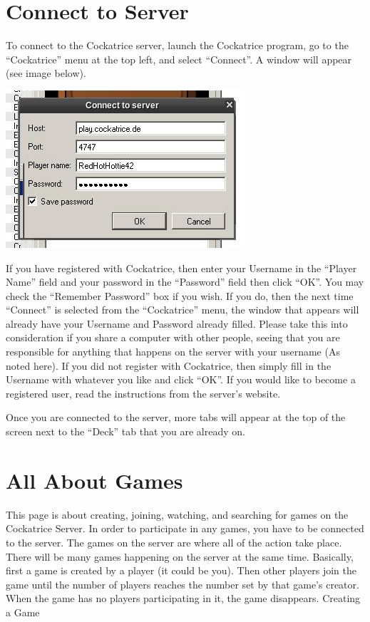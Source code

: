 \documentclass[a4paper]{scrbook}
\begin{document}
\section{Connect to Server}
To connect to the Cockatrice server, launch the Cockatrice program, go to the “Cockatrice” menu at the top left, and select “Connect”. A window will appear (see image below).
\begin{center}
\includegraphics[scale=0.5]{pics/fetch23f3}
\end{center}
If you have registered with Cockatrice, then enter your Username in the “Player Name” field and your password in the “Password” field then click “OK”. You may check the “Remember Password” box if you wish. If you do, then the next time “Connect” is selected from the “Cockatrice” menu, the window that appears will already have your Username and Password already filled. Please take this into consideration if you share a computer with other people, seeing that you are responsible for anything that happens on the server with your username (As noted here). If you did not register with Cockatrice, then simply fill in the Username with whatever you like and click “OK”. If you would like to become a registered user, read the instructions from the server's website.

Once you are connected to the server, more tabs will appear at the top of the screen next to the “Deck” tab that you are already on.

\section{All About Games}
This page is about creating, joining, watching, and searching for games on the Cockatrice Server. In order to participate in any games, you have to be connected to the server. The games on the server are where all of the action take place. There will be many games happening on the server at the same time. Basically, first a game is created by a player (it could be you). Then other players join the game until the number of players reaches the number set by that game's creator. When the game has no players participating in it, the game disappears.
Creating a Game
\end{document}
